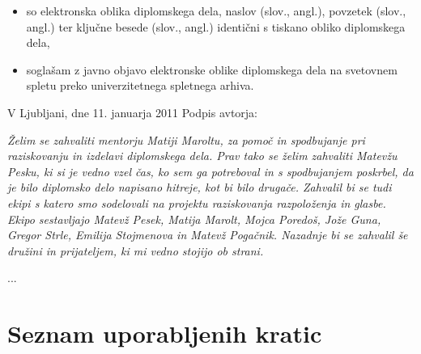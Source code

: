 \documentclass[a4paper, 12pt]{book}
\newcommand{\clearemptydoublepage}{\newpage{\pagestyle{empty}\cleardoublepage}}
\begin{document}
{\begin{itemize}
	\item	so elektronska oblika diplomskega dela, naslov (slov., angl.), povzetek (slov., angl.) ter ključne besede (slov., angl.) identični s tiskano obliko diplomskega dela,
	\item soglašam z javno objavo elektronske oblike diplomskega dela na svetovnem spletu preko univerzitetnega spletnega arhiva.	
\end{itemize}

\vspace{1cm}
\noindent V Ljubljani, dne 11. januarja 2011 \hfill Podpis avtorja:

\clearemptydoublepage

\thispagestyle{empty}\mbox{}\vfill\null\it%
Želim se zahvaliti mentorju Matiji Maroltu, za pomoč in spodbujanje pri raziskovanju in izdelavi diplomskega dela. Prav tako se želim zahvaliti Matevžu Pesku, ki si je vedno vzel čas, ko sem ga potreboval in s spodbujanjem poskrbel, da je bilo diplomsko delo napisano hitreje, kot bi bilo drugače. Zahvalil bi se tudi ekipi s katero smo sodelovali na projektu raziskovanja razpoloženja in glasbe. Ekipo sestavljajo Matevž Pesek, Matija Marolt, Mojca Poredoš, Jože Guna, Gregor Strle, Emilija Stojmenova in Matevž Pogačnik. Nazadnje bi se zahvalil še družini in prijateljem, ki mi vedno stojijo ob strani. 
\rm\normalfont

\clearemptydoublepage

\thispagestyle{empty}\mbox{}{\textheight}\mbox{}\hfill\begin{minipage}{0.55\textwidth}%
...
\normalfont\end{minipage}

\clearemptydoublepage

\def\thepage{}%
\tableofcontents{}


\clearemptydoublepage


\chapter*{Seznam uporabljenih kratic}

}
\end{document}
